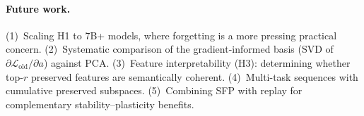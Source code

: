 \paragraph{Future work.}
(1)~Scaling H1 to 7B+ models, where forgetting is a more pressing practical concern.
(2)~Systematic comparison of the gradient-informed basis (SVD of $\partial \mathcal{L}_{\text{old}} / \partial a$) against PCA.
(3)~Feature interpretability (H3): determining whether top-$r$ preserved features are semantically coherent.
(4)~Multi-task sequences with cumulative preserved subspaces.
(5)~Combining SFP with replay for complementary stability--plasticity benefits.
